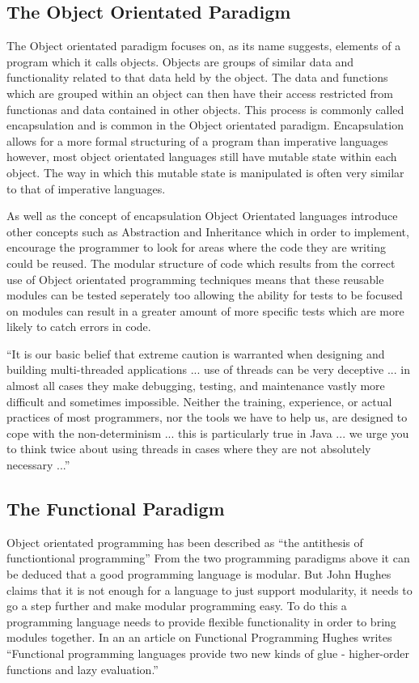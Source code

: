 \documentclass[main.tex]{subfiles}
\begin{document}
\subsection{The Object Orientated Paradigm}
The Object orientated paradigm focuses on, as its name suggests, elements of a program which it calls objects. Objects are groups of similar data and functionality related to that data held by the object. The data and functions which are grouped within an object can then have their access restricted from functionas and data contained in other objects. This process is commonly called encapsulation and is common in the Object orientated paradigm. Encapsulation allows for a more formal structuring of a program than imperative languages however, most object orientated languages still have mutable state within each object. The way in which this mutable state is manipulated is often very similar to that of imperative languages.\cite{Aaby1996} 

As well as the concept of encapsulation Object Orientated languages introduce other concepts such as Abstraction and Inheritance which in order to implement, encourage the programmer to look for areas where the code they are writing could be reused. \cite{DavidJ.Barnes2008} The modular structure of code which results from the correct use of Object orientated programming techniques means that these reusable modules can be tested seperately too allowing the ability for tests to be focused on modules can result in a greater amount of more specific tests which are more likely to catch errors in code.

``It is our basic belief that extreme caution is warranted when designing and building multi-threaded applications ... use of threads can be very deceptive ... in almost all cases they make debugging, testing, and maintenance vastly more difficult and sometimes impossible.  Neither the training, experience, or actual practices of most programmers, nor the tools we have to help us, are designed to cope with the non-determinism ... this is particularly true in Java ... we urge you to think twice about using threads in cases where they are not absolutely necessary ...'' %

\subsection{The Functional Paradigm} %
Object orientated programming has been described as ``the antithesis of functiontional programming'' \cite{Taivalsaari1993} From the two programming paradigms above it can be deduced that a good programming language is modular. But John Hughes claims that it is not enough for a language to just support modularity, it needs to go a step further and make modular programming easy. To do this a programming language needs to provide flexible functionality in order to bring modules together. In an an article on Functional Programming Hughes writes ``Functional programming languages provide two new kinds of glue - higher-order functions and lazy evaluation.''\cite{Hughes1984} 
\end{document}
